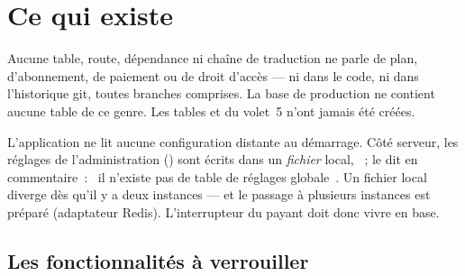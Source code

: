 
\chapter{Ce qui existe}

\begin{constat}
Aucune table, route, dépendance ni chaîne de traduction ne parle de plan, d'abonnement, de
paiement ou de droit d'accès --- ni dans le code, ni dans l'historique git, toutes branches
comprises. La base de production ne contient aucune table de ce genre. Les tables
 et  du volet~5 n'ont jamais été créées.
\end{constat}

\begin{constat}
L'application ne lit aucune configuration distante au démarrage. Côté serveur, les réglages
de l'administration () sont écrits dans un
\emph{fichier} local, ~;  le
dit en commentaire~: \guillemotleft~il n'existe pas de table de réglages globale~\guillemotright.
Un fichier local diverge dès qu'il y a deux instances --- et le passage à plusieurs instances
est préparé (adaptateur Redis). L'interrupteur du payant doit donc vivre en base.
\end{constat}

\section{Les fonctionnalités à verrouiller}

